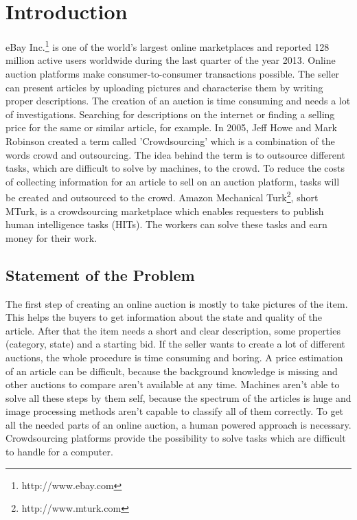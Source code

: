 \documentclass[a4paper]{report}
\begin{document}
  




%

\pagestyle{plain}
\newpage





\dominitoc
\tableofcontents
\newpage

\listoffigures

\listoftables

\lstlistoflistings

\chapter{Introduction}
eBay Inc.\footnote{http://www.ebay.com} is one of the world's largest online marketplaces and reported 128 million active users worldwide during the last quarter of the year 2013. Online auction platforms make consumer-to-consumer transactions possible. The seller can present articles by uploading pictures and characterise them by writing proper descriptions. The creation of an auction is time consuming and needs a lot of investigations. Searching for descriptions on the internet or finding a selling price for the same or similar article, for example. In 2005, Jeff Howe and Mark Robinson created a term called 'Crowdsourcing' which is a combination of the words crowd and outsourcing. The idea behind the term is to outsource different tasks, which are difficult to solve by machines, to the crowd. To reduce the costs of collecting information for an article to sell on an auction platform, tasks will be created and outsourced to the crowd. Amazon Mechanical Turk\footnote{http://www.mturk.com}, short MTurk, is a crowdsourcing marketplace which enables requesters to publish human intelligence tasks (HITs). The workers can solve these tasks and earn money for their work.

\section{Statement of the Problem}
The first step of creating an online auction is mostly to take pictures of the item. This helps the buyers to get information about the state and quality of the article. After that the item needs a short and clear description, some properties (category, state) and a starting bid. If the seller wants to create a lot of different auctions, the whole procedure is time consuming and boring. A price estimation of an article can be difficult, because the background knowledge is missing and other auctions to compare aren't available at any time. Machines aren't able to solve all these steps by them self, because the spectrum of the articles is huge and image processing methods aren't capable to classify all of them correctly. To get all the needed parts of an online auction, a human powered approach is necessary. Crowdsourcing platforms provide the possibility to solve tasks which are difficult to handle for a computer.
\end{document}
